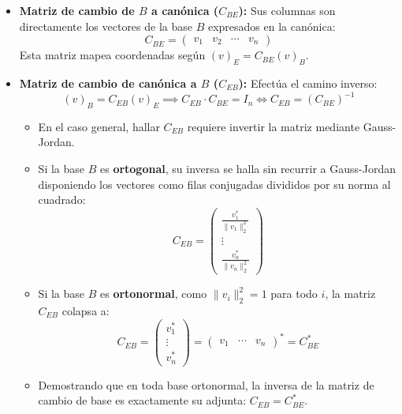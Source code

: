 \documentclass[11pt,a4paper]{article}
\begin{document}
    \begin{itemize}
        \item \textbf{Matriz de cambio de $B$ a canónica ($C_{BE}$):} Sus columnas son directamente los vectores de la base $B$ expresados en la canónica:
            \[
                C_{BE} = \begin{pmatrix} v_1 & v_2 & \cdots & v_n \end{pmatrix}
            \]
        Esta matriz mapea coordenadas según $(v)_E = C_{BE} (v)_B$.
    
        \item \textbf{Matriz de cambio de canónica a $B$ ($C_{EB}$):} Efectúa el camino inverso:
            \[
                (v)_B = C_{EB} (v)_E \implies C_{EB} \cdot C_{BE} = I_n \iff C_{EB} = (C_{BE})^{-1}
            \]
        \begin{itemize}
            \item En el caso general, hallar $C_{EB}$ requiere invertir la matriz mediante Gauss-Jordan.
    
            \item Si la base $B$ es \textbf{ortogonal}, su inversa se halla sin recurrir a Gauss-Jordan disponiendo los vectores como filas conjugadas divididos por su norma al cuadrado:
                \[
                    C_{EB} = \begin{pmatrix} \frac{v_1^*}{\|v_1\|_2^2} \\ \vdots \\ \frac{v_n^*}{\|v_n\|_2^2} \end{pmatrix}
                \]
        
            \item Si la base $B$ es \textbf{ortonormal}, como $\|v_i\|_2^2 = 1$ para todo $i$, la matriz $C_{EB}$ colapsa a:
                \[
                    C_{EB} = \begin{pmatrix} v_1^* \\ \vdots \\ v_n^* \end{pmatrix} = \begin{pmatrix} v_1 & \cdots & v_n \end{pmatrix}^* = C_{BE}^*
                \]
            \item Demostrando que en toda base ortonormal, la inversa de la matriz de cambio de base es exactamente su adjunta: $C_{EB} = C_{BE}^*$.
        \end{itemize}
\end{itemize}
\end{document}

